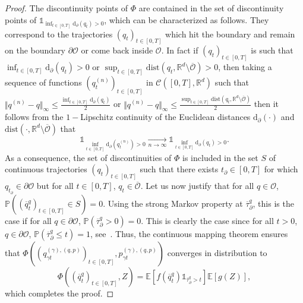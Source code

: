 \documentclass[preprint,EJP]{ejpecp}
\begin{document}
\begin{proof}
The discontinuity points of $\Phi$ are contained in the set of discontinuity points of $\mathbb{1}_{\inf_{t \in [0,T]} \mathrm{d}_\partial(q_t)>0}$, which can be characterized as follows. They correspond to the trajectories $(q_t)_{t\in [0,T]}$ which hit the boundary and remain on the boundary $\partial\mathcal{O}$ or come back inside $\mathcal{O}$. In fact if $(q_t)_{t\in [0,T]}$ is such that $\inf_{t\in[0,T]}\mathrm{d}_\partial(q_t)>0$ or $\sup_{t\in[0,T]}\mathrm{dist}(q_t,\mathbb{R}^d\setminus\overline{\mathcal{O}})>0$, then taking a sequence of functions $(q^{(n)}_t)_{t\in[0,T]}$ in $\mathcal{C}([0,T],\mathbb{R}^d)$ such that $\Vert q^{(n)}-q\Vert_\infty\leq\frac{\inf_{t\in[0,T]}\mathrm{d}_\partial(q_t)}{2}$ or $\Vert q^{(n)}-q\Vert_\infty\leq\frac{\sup_{t\in[0,T]}\mathrm{dist}(q_t,\mathbb{R}^d\setminus\overline{\mathcal{O}})}{2}$ then it follows from the $1-$Lipschitz continuity of the Euclidean distances $\mathrm{d}_\partial(\cdot)$ and $\mathrm{dist}(\cdot,\mathbb{R}^d\setminus\overline{\mathcal{O}})$ that 
\begin{equation*}
  \mathbb{1}_{\inf_{t \in [0,T]} \mathrm{d}_\partial(q^{(n)}_t)>0} \underset{n\rightarrow\infty}{\longrightarrow} \mathbb{1}_{\inf_{t \in [0,T]} \mathrm{d}_\partial(q_t)>0}.
\end{equation*}
As a consequence, the set of discontinuities of $\Phi$ is included in the set $S$ of continuous trajectories $(q_t)_{t \in [0,T]}$ such that there exists $t_\partial \in [0,T]$ for which $q_{t_\partial} \in \partial \mathcal{O}$ but for all $t \in [0,T]$, $q_t \in \overline{\mathcal{O}}$. Let us now justify that for all $q \in \mathcal{O}$, $\mathbb{P}((\overline{q}^q_t)_{t \in [0,T]}\in S)=0$. 
  Using the strong Markov property at $\overline{\tau}^q_\partial$, this is the case if for all $q\in\partial\mathcal{O}$, $\mathbb{P}(\overline{\tau}^q_\partial>0)=0$. This is clearly the case since for all $t>0$, $q\in\partial\mathcal{O}$, $\mathbb{P}(\overline{\tau}^q_\partial\leq t)=1$, see~\cite[p. 347]{FF}. Thus, the continuous mapping theorem ensures that $\Phi( (q^{(\gamma),(q,p)}_{\gamma t})_{t \in [0,T]}, p^{(\gamma),(q,p)}_{\gamma t})$ converges in distribution to $$\Phi\left( (\overline{q}^q_t)_{t \in [0,T]}, Z\right) = \mathbb{E}\left[f(\overline{q}^q_t) \mathbb{1}_{\overline{\tau}^{q}_\partial>t}\right] \mathbb{E}\left[g(Z)\right],$$ which completes the proof.
\end{proof}
 
\end{document}
